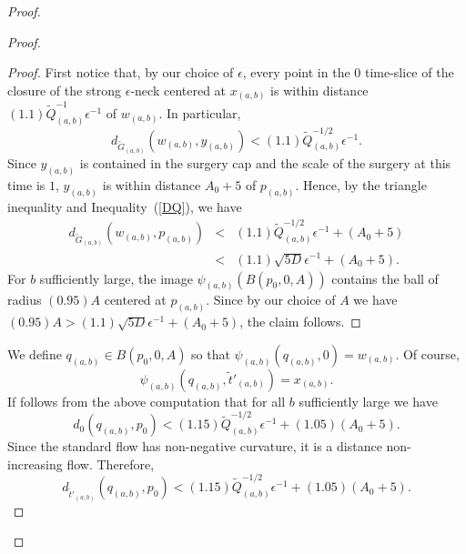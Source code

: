 \begin{proof}
\begin{proof}
\begin{proof}
First notice that, by our choice of $\epsilon$,
 every point in the $0$ time-slice of the closure of the strong $\epsilon$-neck
centered at $x_{(a,b)}$ is within distance $(1.1)\tilde Q_{(a,b)}^{-1}\epsilon^{-1}$
of $w_{(a,b)}$. In particular,
$$d_{\widetilde G_{(a,b)}}(w_{(a,b)},y_{(a,b)})<(1.1)\tilde Q_{(a,b)}^{-1/2}\epsilon^{-1}.$$
Since $y_{(a,b)}$ is contained in the surgery cap and the scale of the surgery
at this time is $1$, $y_{(a,b)}$ is within distance $A_0+5$ of $p_{(a,b)}$.
Hence, by the triangle inequality and Inequality~(\ref{DQ}), we have
\begin{eqnarray*}
d_{\widetilde G_{(a,b)}}(w_{(a,b)},p_{(a,b)}) & < & (1.1)\tilde Q_{(a,b)}^{-1/2}\epsilon^{-1}+(A_0+5) \\
& < & (1.1)\sqrt{5D}\epsilon^{-1}+(A_0+5).
\end{eqnarray*}
For $b$ sufficiently large, the image  $\psi_{(a,b)}(B(p_0,0,A))$
contains the ball of radius $(0.95)A$
centered at $p_{(a,b)}$. Since by our choice of $A$ we have $(0.95)A>(1.1)\sqrt{5D}\epsilon^{-1}+(A_0+5)$,
the claim follows.
\end{proof}

We define $q_{(a,b)}\in B(p_0,0,A)$ so that
$\psi_{(a,b)}(q_{(a,b)},0)=w_{(a,b)}$. Of course,
$$\psi_{(a,b)}(q_{(a,b)},\tilde t'_{(a,b)})=x_{(a,b)}.$$ If follows from the
above computation that for all $b$ sufficiently large we have
$$d_0(q_{(a,b)},p_0)<(1.15)\tilde Q_{(a,b)}^{-1/2}\epsilon^{-1}+(1.05)(A_0+5).$$
Since the standard flow has non-negative curvature, it is a distance non-increasing flow. Therefore,
$$d_{\tilde t'_{(a,b)}}(q_{(a,b)},p_0)<(1.15)\tilde Q_{(a,b)}^{-1/2}\epsilon^{-1}+(1.05)(A_0+5).$$


\end{proof}
\end{proof}
